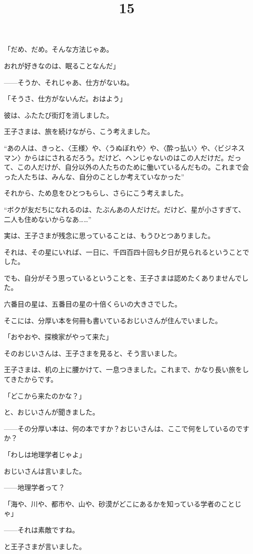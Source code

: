 「だめ、だめ。そんな方法じゃあ。

おれが好きなのは、眠ることなんだ」

——そうか、それじゃあ、仕方がないね。

「そうさ、仕方がないんだ。おはよう」

彼は、ふたたび街灯を消しました。

王子さまは、旅を続けながら、こう考えました。

“あの人は、きっと、〈王様〉や、〈うぬぼれや〉や、〈酔っ払い〉や、〈ビジネスマン〉からはにされるだろう。だけど、ヘンじゃないのはこの人だけだ。だって、この人だけが、自分以外の人たちのために働いているんだもの。これまで会った人たちは、みんな、自分のことしか考えていなかった”

それから、ため息をひとつもらし、さらにこう考えました。

“ボクが友だちになれるのは、たぶんあの人だけだ。だけど、星が小さすぎて、二人も住めないからなあ……”

実は、王子さまが残念に思っていることは、もうひとつありました。

それは、その星にいれば、一日に、千四百四十回も夕日が見られるということでした。

でも、自分がそう思っているということを、王子さまは認めたくありませんでした。

\title{15}

六番目の星は、五番目の星の十倍くらいの大きさでした。

そこには、分厚い本を何冊も書いているおじいさんが住んでいました。

「おやおや、探検家がやって来た」

そのおじいさんは、王子さまを見ると、そう言いました。

王子さまは、机の上に腰かけて、一息つきました。これまで、かなり長い旅をしてきたからです。

「どこから来たのかな？」

と、おじいさんが聞きました。

——その分厚い本は、何の本ですか？おじいさんは、ここで何をしているのですか？

「わしは地理学者じゃよ」

おじいさんは言いました。

——地理学者って？

「海や、川や、都市や、山や、砂漠がどこにあるかを知っている学者のことじゃ」

——それは素敵ですね。

と王子さまが言いました。

